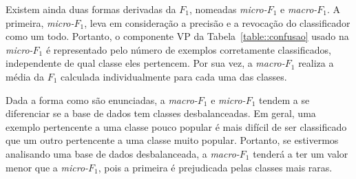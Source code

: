 Existem ainda duas formas derivadas da $F_1$, nomeadas \textit{micro-$F_1$} e \textit{macro-$F_1$}. A primeira, \textit{micro-$F_1$}, leva em consideração a precisão e a revocação do classificador como um todo. 
Portanto, o componente VP da Tabela~\ref{table::confusao} usado na \textit{micro-$F_1$} é representado pelo número de exemplos corretamente classificados, independente de qual classe eles pertencem.
Por sua vez, a \textit{macro-$F_1$} realiza a média da $F_1$ calculada individualmente para cada uma das classes. 

Dada a forma como são enunciadas, a \textit{macro-$F_1$} e \textit{micro-$F_1$} tendem a se diferenciar se a base de dados tem classes desbalanceadas. Em geral, uma exemplo pertencente a uma classe pouco popular é mais difícil de ser classificado que um outro pertencente a uma classe muito popular. Portanto, se estivermos analisando uma base de dados desbalanceada, a \textit{macro-$F_1$} tenderá a ter um valor menor que a \textit{micro-$F_1$}, pois a primeira é prejudicada pelas classes mais raras. 


